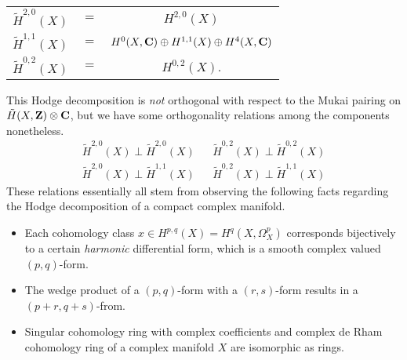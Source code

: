 \begin{center}
    \begin{tabular}{r c c}
        $\widetilde{H}^{2,0}(X)$ & $=$ & $H^{2,0}(X)$ \\
        $\widetilde{H}^{1,1}(X)$ & $=$ & $H^{0}(X, \mathbf C) \oplus H^{1,1}(X) \oplus H^{4}(X, \mathbf C)$ \\
        $\widetilde{H}^{0,2}(X)$ & $=$ & $H^{0,2}(X)$.
    \end{tabular}
\end{center}

\begin{remark}
    This Hodge decomposition is \emph{not} orthogonal with respect to the Mukai pairing on $\,\tilde{\!{H}}(X, \mathbf Z) \otimes \mathbf C$, but we have some orthogonality relations among the components nonetheless. 
    \begin{align}
        \widetilde{H}^{2,0}(X) \perp \widetilde{H}^{2,0}(X) & & \widetilde{H}^{0,2}(X) \perp \widetilde{H}^{0,2}(X) \label{eq: orthogonality relations 1}\\
        \widetilde{H}^{2,0}(X) \perp \widetilde{H}^{1,1}(X) & &\widetilde{H}^{0,2}(X) \perp \widetilde{H}^{1,1}(X) \label{eq: orthogonality relations 2}
    \end{align}
    These relations essentially all stem from observing the following facts regarding the Hodge decomposition of a compact complex manifold.
    \begin{itemize}[label = $\circ$]
        \item{
            Each cohomology class $x \in H^{p,q}(X) = H^q(X, \Omega_X^p)$ corresponds bijectively to a certain \emph{harmonic} differential form, which is a smooth complex valued $(p,q)$-form.
        }
        \item{
            The wedge product of a $(p,q)$-form with a $(r,s)$-form results in a $(p+r, q+s)$-from.
        }
        \item{
            Singular cohomology ring with complex coefficients and complex de Rham cohomology ring of a complex manifold $X$ are isomorphic as rings.
        }
    \end{itemize}
\end{remark}

